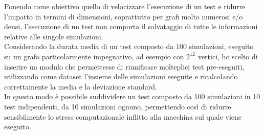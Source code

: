 \documentclass{article}
\begin{document}
Ponendo come obiettivo quello di velocizzare l'esecuzione di un test e ridurre l'impatto in termini di dimensioni, soprattutto per grafi molto numerosi e/o densi, l'esecuzione di un test non comporta il salvataggio di tutte le informazioni relative alle singole simulazioni.\\
Considerando la durata media di un test composto da 100 simulazioni, eseguito su un grafo particolarmente  impegnativo, ad esempio con $2^{12^{\mathrm{}}}$ vertici, ho scelto di inserire un modulo che permettesse di riunificare molteplici test pre-eseguiti, utilizzando come dataset l'insieme delle simulazioni eseguite e ricalcolando correttamente la media e la deviazione standard. \\
In questo modo è possibile suddividere un test composto da 100 simulazioni in 10 test indipendenti, da 10 simulazioni ognuno, permettendo così di ridurre sensibilmente lo stress computazionale inflitto alla macchina sul quale viene eseguito.
\end{document}
